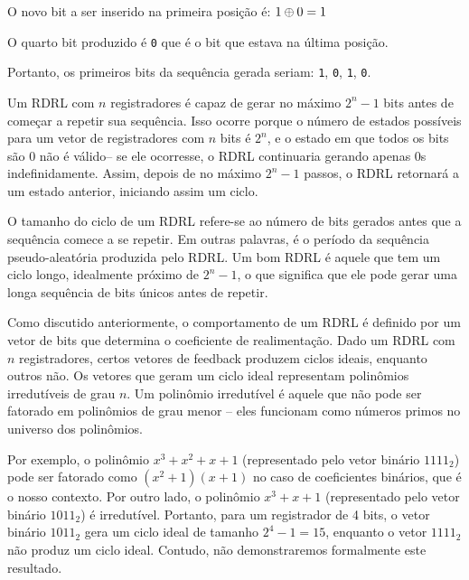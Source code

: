 \begin{example}
\begin{center}
\end{center}

O novo bit a ser inserido na primeira posição é: $1 \oplus 0 = 1$

O quarto bit produzido é {\tt 0} que é o bit que estava na última posição.

Portanto, os primeiros bits da sequência gerada seriam: {\tt 1}, {\tt 0}, {\tt 1}, {\tt 0}.

\end{example}


Um RDRL com $n$ registradores é capaz de gerar no máximo $2^n - 1$ bits antes de começar a repetir sua sequência.
Isso ocorre porque o número de estados possíveis para um vetor de registradores com $n$ bits é $2^n$, e o estado em que todos os bits são 0 não é válido-- se ele ocorresse, o RDRL continuaria gerando apenas 0s indefinidamente.
Assim, depois de no máximo $2^n - 1$ passos, o RDRL retornará a um estado anterior, iniciando assim um ciclo.

O tamanho do ciclo de um RDRL refere-se ao número de bits gerados antes que a sequência comece a se repetir.
Em outras palavras, é o período da sequência pseudo-aleatória produzida pelo RDRL.
Um bom RDRL é aquele que tem um ciclo longo, idealmente próximo de $2^n - 1$, o que significa que ele pode gerar uma longa sequência de bits únicos antes de repetir.

Como discutido anteriormente, o comportamento de um RDRL é definido por um vetor de bits que determina o coeficiente de realimentação.
Dado um RDRL com $n$ registradores, certos vetores de feedback produzem ciclos ideais, enquanto outros não.
Os vetores que geram um ciclo ideal representam polinômios irredutíveis de grau $n$.
Um polinômio irredutível é aquele que não pode ser fatorado em polinômios de grau menor -- eles funcionam como números primos no universo dos polinômios.

Por exemplo, o polinômio $x^3 + x^2 + x + 1$ (representado pelo vetor binário $1111_2$) pode ser fatorado como $(x^2 + 1)(x + 1)$ no caso de coeficientes binários, que é o nosso contexto.
Por outro lado, o polinômio $x^3 + x + 1$ (representado pelo vetor binário \(1011_2\)) é irredutível.
Portanto, para um registrador de 4 bits, o vetor binário $1011_2$ gera um ciclo ideal de tamanho $2^4 - 1 = 15$, enquanto o vetor $1111_2$ não produz um ciclo ideal.
Contudo, não demonstraremos formalmente este resultado. 

